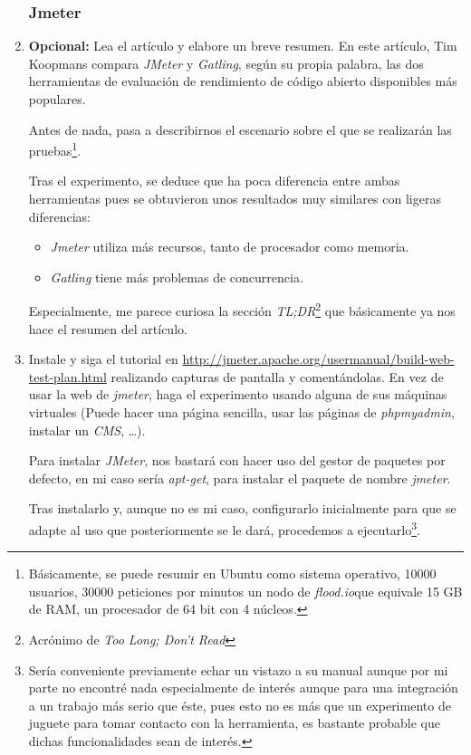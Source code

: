 \documentclass[paper=a4, fontsize=11pt]{scrartcl} %
\numberwithin{equation}{section} %
\numberwithin{figure}{section} %
\numberwithin{table}{section} %
\begin{document}
\begin{enumerate}
	\subsubsection{Jmeter}
		\item \textbf{Opcional:} Lea el artículo y elabore un breve resumen.
		En este artículo\cite{flood_article}, Tim Koopmans compara \textit{JMeter} y \textit{Gatling},
		según su propia palabra, las dos herramientas de evaluación de rendimiento de código abierto
		disponibles más populares.
		
		Antes de nada, pasa a describirnos el escenario sobre el que se realizarán las pruebas\footnote{
		Básicamente, se puede resumir en Ubuntu como sistema operativo, 10000 usuarios, 30000 peticiones
		por minutos un nodo de \textit{flood.io}\footnotemark que 
		equivale 15 GB de RAM, un procesador de 64 bit con 4 núcleos.}.
		
		Tras el experimento, se deduce que ha poca diferencia entre ambas herramientas pues se obtuvieron
		unos resultados muy similares con ligeras diferencias:
		\begin{itemize}
			\item \textit{Jmeter} utiliza más recursos, tanto de procesador como memoria.
			\item \textit{Gatling} tiene más problemas de concurrencia.
		\end{itemize}
		
		Especialmente, me parece curiosa la sección \textit{TL;DR}\footnote{Acrónimo de \textit{Too
		Long; Don't Read}} que básicamente ya nos hace el resumen del artículo.
		
		\item Instale y siga el tutorial en \url{http://jmeter.apache.org/usermanual/build-web-test-plan.html}
		realizando capturas de pantalla y comentándolas. En vez de usar la web de \textit{jmeter},
		haga el experimento usando alguna de sus máquinas virtuales (Puede hacer una página sencilla,
		usar las páginas de \textit{phpmyadmin}, instalar un \textit{CMS}, \dots).
		
		Para instalar \textit{JMeter}, nos bastará con hacer uso del gestor de paquetes por defecto, en
		mi caso sería \textit{apt-get}, para instalar el paquete de nombre \textit{jmeter}.
		
		Tras instalarlo y, aunque no es mi caso, configurarlo inicialmente para que se adapte al uso que
		posteriormente se le dará, procedemos a ejecutarlo\footnote{Sería conveniente previamente echar
		un vistazo a su manual \cite{man_jmeter} aunque por mi parte no encontré nada especialmente de
		interés aunque para una integración a un trabajo más serio que éste, pues esto no es más que un
		experimento de juguete para tomar contacto con la herramienta, es bastante probable que dichas
		funcionalidades sean de interés.}.
		

\end{enumerate}
\end{document}
